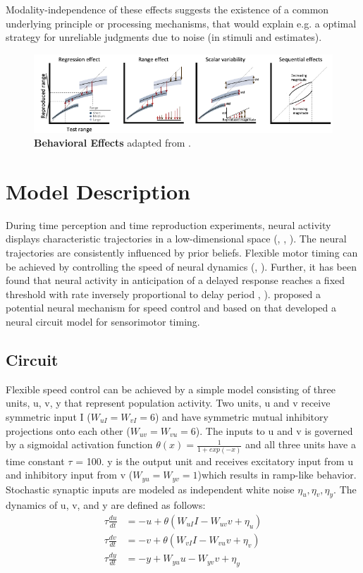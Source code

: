 \documentclass[9pt]{article}
\begin{document}
Modality-independence of these effects suggests the existence of a common underlying principle or processing mechanisms, that would explain e.g. a optimal strategy for unreliable judgments due to noise (in stimuli and estimates).

\begin{figure}[h]
	\centering
	\includegraphics{figures/behavioural_effects_petzschner.pdf}
	\caption{\textbf{Behavioral Effects} adapted from \cite{Petzschner2015}.}
\label{fig:behavioraleffects}
\end{figure}


\section{Model Description}
During time perception and time reproduction experiments, neural activity displays characteristic trajectories in a low-dimensional space (\cite{Meirhaeghe2021}, \cite{Wang2018}, \cite{Henke2021}). 
The neural trajectories are consistently influenced by prior beliefs. 
Flexible motor timing can be achieved by controlling the speed of neural dynamics (\cite{Sohn2019}, \cite{Wang2018}). 
Further, it has been found that neural activity in anticipation of a delayed response reaches a fixed threshold with rate inversely proportional to delay period \cite{Murakami2014}, \cite{Mita2009}).
\cite{Wang2018} proposed a potential neural mechanism for speed control and based on that \cite{Egger2020} developed a neural circuit model for sensorimotor timing.

\subsection{Circuit}
Flexible speed control can be achieved by a simple model consisting of three units, u, v, y that represent population activity. 
Two units, u and v receive symmetric input I ($W_{uI}=W_{vI}=6$) and have symmetric mutual inhibitory projections onto each other ($W_{uv}=W_{vu}=6$). 
The inputs to u and v is governed by a sigmoidal activation function $\theta(x) = \frac{1}{1+exp(-x)}$ and all three units have a time constant $\tau$ = 100. 
y is the output unit and receives excitatory input from u and inhibitory input from v ($W_{yu}=W_{yv}=1$)which results in ramp-like behavior.
Stochastic synaptic inputs are modeled as independent white noise $\eta_u, \eta_v, \eta_y$.
The dynamics of u, v, and y are defined as follows:
\begin{align} \label{circuit}
	\tau\frac{du}{dt} & = -u + \theta(W_{uI}I - W_{uv}v + \eta_u) \\
	\tau\frac{dv}{dt} & = -v + \theta(W_{vI}I - W_{vu}v + \eta_v) \\
	\tau\frac{dy}{dt} & = -y + W_{yu}u - W_{yv}v + \eta_y
	\end{align}
\end{document}
